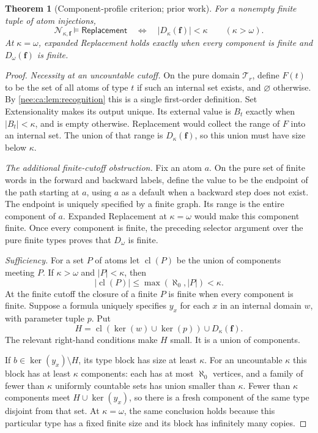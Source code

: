 \documentclass[11pt,letterpaper]{article}
\numberwithin{equation}{section}
\theoremstyle{plain}
\newtheorem{theorem}{Theorem}[section]
\theoremstyle{definition}
\theoremstyle{remark}
\newcommand{\Rep}{\mathsf{Replacement}}
\newcommand{\kerat}{\operatorname{ker}}
\begin{document}
\begin{theorem}[Component-profile criterion; prior work]\label{nee:ca:thm:profile}
For a nonempty finite tuple of atom injections,
\[
\mathcal N_{\kappa,\boldsymbol f}\models\Rep
\quad\Longleftrightarrow\quad |D_\kappa(\boldsymbol f)|<\kappa
\qquad(\kappa>\omega).
\]
At $\kappa=\omega$, expanded Replacement holds exactly when every component is finite and $D_\omega(\boldsymbol f)$ is finite.
\end{theorem}
\begin{proof}
\emph{Necessity at an uncountable cutoff.}
On the pure domain $\mathcal T_r$, define $F(t)$ to be the set of all atoms of type $t$ if such an internal set exists, and $\varnothing$ otherwise. By \cref{nee:ca:lem:recognition} this is a single first-order definition. Set Extensionality makes its output unique. Its external value is $B_t$ exactly when $|B_t|<\kappa$, and is empty otherwise. Replacement would collect the range of $F$ into an internal set. The union of that range is $D_\kappa(\boldsymbol f)$, so this union must have size below $\kappa$.

\emph{The additional finite-cutoff obstruction.}
Fix an atom $a$. On the pure set of finite words in the forward and backward labels, define the value to be the endpoint of the path starting at $a$, using $a$ as a default when a backward step does not exist. The endpoint is uniquely specified by a finite graph. Its range is the entire component of $a$. Expanded Replacement at $\kappa=\omega$ would make this component finite. Once every component is finite, the preceding selector argument over the pure finite types proves that $D_\omega$ is finite.

\emph{Sufficiency.}
For a set $P$ of atoms let $\operatorname{cl}(P)$ be the union of components meeting $P$. If $\kappa>\omega$ and $|P|<\kappa$, then
\begin{equation}\label{nee:ca:eq:component-closure}
|\operatorname{cl}(P)|\leq\max(\aleph_0,|P|)<\kappa.
\end{equation}
At the finite cutoff the closure of a finite $P$ is finite when every component is finite. Suppose a formula uniquely specifies $y_x$ for each $x$ in an internal domain $w$, with parameter tuple $p$. Put
\[
H=\operatorname{cl}(\kerat(w)\cup\kerat(p))\cup D_\kappa(\boldsymbol f).
\]
The relevant right-hand conditions make $H$ small. It is a union of components.

If $b\in\kerat(y_x)\setminus H$, its type block has size at least $\kappa$. For an uncountable $\kappa$ this block has at least $\kappa$ components: each has at most $\aleph_0$ vertices, and a family of fewer than $\kappa$ uniformly countable sets has union smaller than $\kappa$. Fewer than $\kappa$ components meet $H\cup\kerat(y_x)$, so there is a fresh component of the same type disjoint from that set. At $\kappa=\omega$, the same conclusion holds because this particular type has a fixed finite size and its block has infinitely many copies.


\end{proof}
\end{document}
